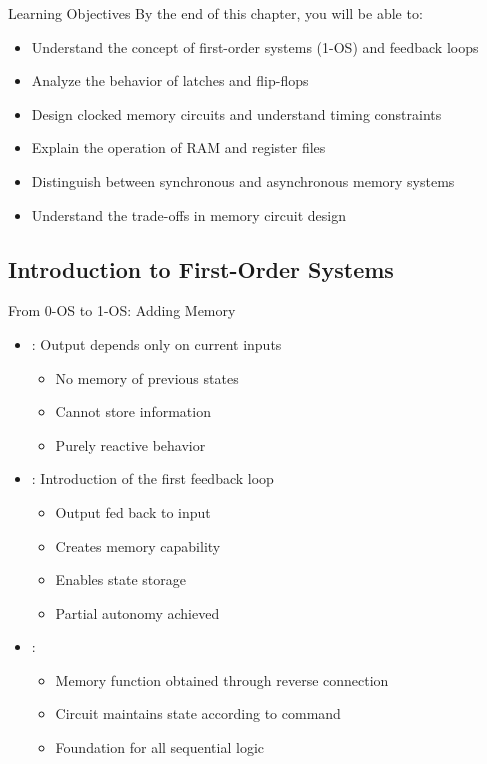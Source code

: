 \begin{frame}{Learning Objectives}
By the end of this chapter, you will be able to:
\begin{itemize}
\item Understand the concept of first-order systems (1-OS) and feedback loops
\item Analyze the behavior of latches and flip-flops
\item Design clocked memory circuits and understand timing constraints
\item Explain the operation of RAM and register files
\item Distinguish between synchronous and asynchronous memory systems
\item Understand the trade-offs in memory circuit design
\end{itemize}
\end{frame}

\subsection{Introduction to First-Order Systems}

\begin{frame}{From 0-OS to 1-OS: Adding Memory}
\begin{itemize}
\item {}: Output depends only on current inputs
\begin{itemize}
\item No memory of previous states
\item Cannot store information
\item Purely reactive behavior
\end{itemize}
\vspace{0.5cm}
\item {}: Introduction of the first feedback loop
\begin{itemize}
\item Output fed back to input
\item Creates memory capability
\item Enables state storage
\item Partial autonomy achieved
\end{itemize}
\vspace{0.3cm}
\item {}: 
\begin{itemize}
\item Memory function obtained through reverse connection
\item Circuit maintains state according to command
\item Foundation for all sequential logic
\end{itemize}
\end{itemize}
\end{frame}

